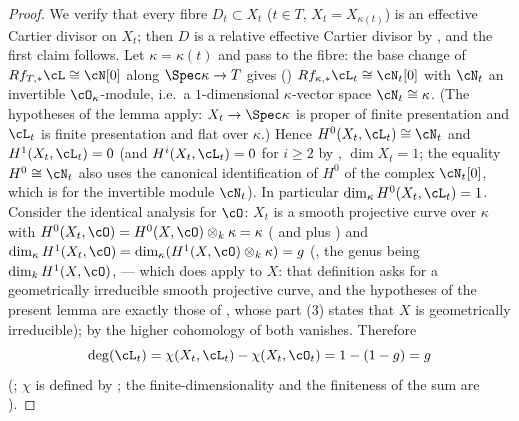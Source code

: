 \begin{proof}
We verify that every fibre $D_t\subset X_t$ ($t\in T$,
$X_t=X_{\kappa(t)}$) is an effective Cartier divisor on $X_t$; then
$D$ is a relative effective Cartier divisor by ,
and the first claim follows.
Let $\kappa=\kappa(t)$ and pass to the fibre: the base change of
$Rf_{T,*}\cL\cong\cN[0]$ along $\Spec\kappa\to T$ gives
()
$Rf_{\kappa,*}\cL_t\cong\cN_t[0]$ with $\cN_t$ an invertible
$\cO_\kappa$-module, i.e.\ a $1$-dimensional $\kappa$-vector space
$\cN_t\cong\kappa$.  (The hypotheses of the lemma apply: $X_t\to\Spec
\kappa$ is proper of finite presentation and $\cL_t$ is finite
presentation and flat over $\kappa$.)  Hence
$H^0(X_t,\cL_t)\cong\cN_t$ and $H^1(X_t,\cL_t)=0$ (and
$H^i(X_t,\cL_t)=0$ for $i\ge2$ by ,
$\dim X_t=1$; the equality $H^0\cong\cN_t$ also uses the canonical
identification of $H^0$ of the complex $\cN_t[0]$, which is
 for the invertible module
$\cN_t$).
In particular $\dim_\kappa H^0(X_t,\cL_t)=1$.
Consider the identical analysis for $\cO$: $X_t$ is a smooth projective
curve over $\kappa$ with $H^0(X_t,\cO)=H^0(X,\cO)\otimes_k\kappa=\kappa$
( and
 plus ) and
$\dim_\kappa H^1(X_t,\cO)=\dim_\kappa(H^1(X,\cO)\otimes_k\kappa)=g$
(, the genus being
$\dim_kH^1(X,\cO)$,  --- which does apply to $X$:
that definition asks for a geometrically irreducible smooth projective
curve, and the hypotheses of the present lemma are exactly those of
, whose part (3) states that $X$ is
geometrically irreducible); by
 the higher cohomology of both vanishes.
Therefore
\[
\deg(\cL_t)=\chi(X_t,\cL_t)-\chi(X_t,\cO_t)=1-(1-g)=g
\]
(; $\chi$ is defined by
; the finite-dimensionality and the
finiteness of the sum are ).


\end{proof}
